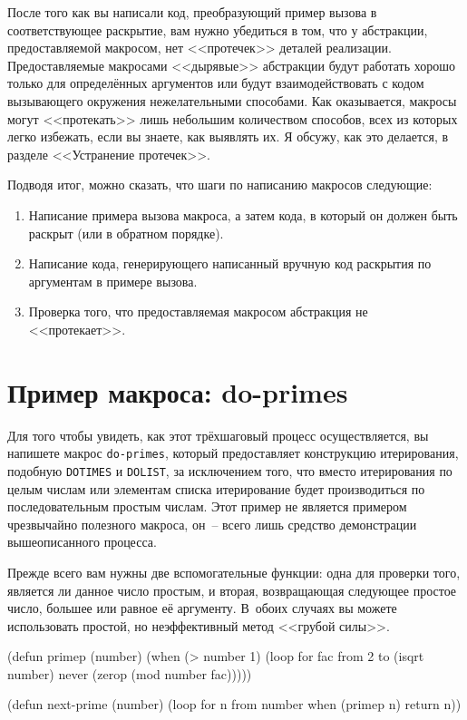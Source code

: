 После того как вы написали код, преобразующий пример вызова в соответствующее раскрытие,
вам нужно убедиться в том, что у абстракции, предоставляемой макросом, нет <<протечек>>
деталей реализации. Предоставляемые макросами <<дырявые>> абстракции будут работать хорошо
только для определённых аргументов или будут взаимодействовать с кодом вызывающего
окружения нежелательными способами. Как оказывается, макросы могут <<протекать>> лишь
небольшим количеством способов, всех из которых легко избежать, если вы знаете, как
выявлять их. Я обсужу, как это делается, в разделе <<Устранение протечек>>.

Подводя итог, можно сказать, что шаги по написанию макросов следующие:

\begin{enumerate}
\item Написание примера вызова макроса, а затем кода, в который он должен быть раскрыт
  (или в обратном порядке).
  
\item Написание кода, генерирующего написанный вручную код раскрытия по аргументам в
  примере вызова.

\item Проверка того, что предоставляемая макросом абстракция не <<протекает>>.
\end{enumerate}

\section{Пример макроса: do-primes}

Для того чтобы увидеть, как этот трёхшаговый процесс осуществляется, вы напишете макрос
\lstinline{do-primes}, который предоставляет конструкцию итерирования, подобную
\lstinline{DOTIMES} и \lstinline{DOLIST}, за исключением того, что вместо итерирования по целым
числам или элементам списка итерирование будет производиться по последовательным простым
числам. Этот пример не является примером чрезвычайно полезного макроса, он~-- всего лишь
средство демонстрации вышеописанного процесса.

Прежде всего вам нужны две вспомогательные функции: одна для проверки того, является ли
данное число простым, и вторая, возвращающая следующее простое число, большее или равное
её аргументу. В~обоих случаях вы можете использовать простой, но неэффективный метод
<<грубой силы>>.

\begin{myverb}
(defun primep (number)
  (when (> number 1)
    (loop for fac from 2 to (isqrt number) 
          never (zerop (mod number fac)))))

(defun next-prime (number)
  (loop for n from number when (primep n) return n))
\end{myverb}


